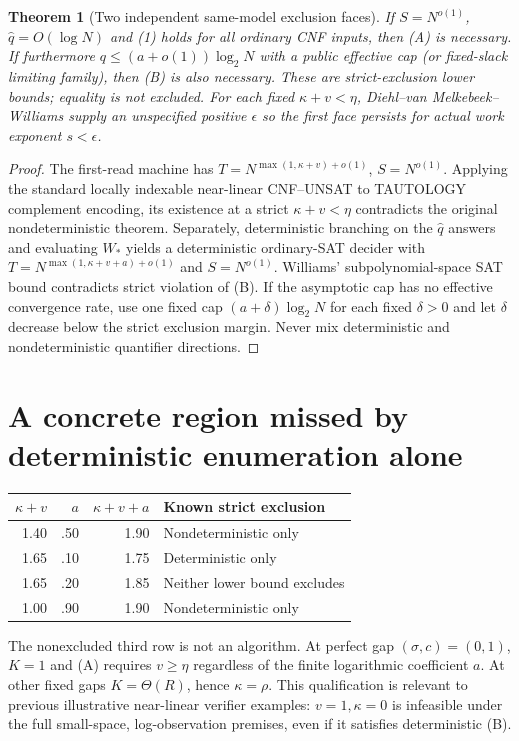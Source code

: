 \documentclass[11pt]{article}
\newtheorem{theorem}{Theorem}
\begin{document}
\begin{theorem}[Two independent same-model exclusion faces]
If $S=N^{o(1)}$, $\widehat q=O(\log N)$ and (1) holds for all ordinary CNF inputs, then (A) is necessary. If furthermore $q\le(a+o(1))\log_2N$ with a public effective cap (or fixed-slack limiting family), then (B) is also necessary. These are strict-exclusion lower bounds; equality is not excluded. For each fixed $\kappa+v<\eta$, Diehl--van Melkebeek--Williams supply an unspecified positive $\epsilon$ so the first face persists for actual work exponent $s<\epsilon$.
\end{theorem}
\begin{proof}
The first-read machine has $T=N^{\max(1,\kappa+v)+o(1)}$, $S=N^{o(1)}$. Applying the standard locally indexable near-linear CNF--UNSAT to TAUTOLOGY complement encoding, its existence at a strict $\kappa+v<\eta$ contradicts the original nondeterministic theorem. Separately, deterministic branching on the $\widehat q$ answers and evaluating $W_*$ yields a deterministic ordinary-SAT decider with $T=N^{\max(1,\kappa+v+a)+o(1)}$ and $S=N^{o(1)}$. Williams' subpolynomial-space SAT bound contradicts strict violation of (B). If the asymptotic cap has no effective convergence rate, use one fixed cap $(a+\delta)\log_2N$ for each fixed $\delta>0$ and let $\delta$ decrease below the strict exclusion margin. Never mix deterministic and nondeterministic quantifier directions.
\end{proof}

\section{A concrete region missed by deterministic enumeration alone}
\begin{center}\begin{tabular}{@{}rrrl@{}}\toprule
$\kappa+v$&$a$&$\kappa+v+a$&Known strict exclusion\\\midrule
1.40&.50&1.90&Nondeterministic only\\
1.65&.10&1.75&Deterministic only\\
1.65&.20&1.85&Neither lower bound excludes\\
1.00&.90&1.90&Nondeterministic only\\\bottomrule
\end{tabular}\end{center}
The nonexcluded third row is not an algorithm. At perfect gap $(\sigma,c)=(0,1)$, $K=1$ and (A) requires $v\ge\eta$ regardless of the finite logarithmic coefficient $a$. At other fixed gaps $K=\Theta(R)$, hence $\kappa=\rho$. This qualification is relevant to previous illustrative near-linear verifier examples: $v=1,\kappa=0$ is infeasible under the full small-space, log-observation premises, even if it satisfies deterministic (B).
\end{document}
